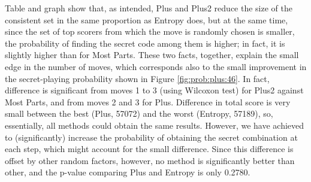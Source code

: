 \documentclass[preprint,12pt]{elsarticle}
\begin{document}
%
Table and graph show that, as intended, Plus and Plus2 reduce the size
of the consistent set  in the same proportion as Entropy does, but at the
same time, since the set of top scorers from which the move is
randomly chosen is smaller, the probability of finding the secret code
among them is higher; in fact, it is slightly higher than for Most
Parts. These two facts, together, explain the small edge in the number
of moves, which corresponds also to the small improvement in the
secret-playing probability shown in Figure \ref{fig:prob:plus:46}. In
fact, difference is significant from moves 1 to 3 (using Wilcoxon
test) for Plus2 against Most Parts, and from moves 2 and 3 for
Plus. Difference in total score is very small between the best (Plus,
57072) and the worst (Entropy, 57189), so, essentially, all methods
could obtain the same results. However, we have achieved
 to (significantly) increase the probability of obtaining the secret
 combination at each step, which might account for the small
 difference. Since this difference is offset by other random factors,
 however, no method is significantly better than other, and the
 p-value comparing Plus and Entropy is only 0.2780.
\end{document}
